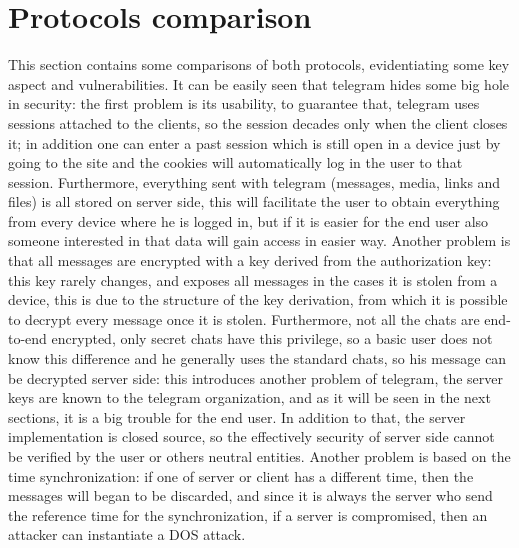 \documentclass{article}
\begin{document}

\section{Protocols comparison}

This section contains some comparisons of both protocols, evidentiating some key aspect and vulnerabilities. \newline
It can be easily seen that telegram hides some big hole in security: the first problem is its usability, to guarantee that, telegram uses sessions attached to the clients, so the session decades only when the client closes it; in addition one can enter a past session which is still open in a device just by going to the site and the cookies will automatically log in the user to that session. Furthermore, everything sent with telegram (messages, media, links and files) is all stored on server side, this will facilitate the user to obtain everything from every device where he is logged in, but if it is easier for the end user also someone interested in that data will gain access in easier way. Another problem is that all messages are encrypted with a key derived from the authorization key: this key rarely changes, and exposes all messages in the cases it is stolen from a device, this is due to the structure of the key derivation, from which it is possible to decrypt every message once it is stolen.\newline
Furthermore, not all the chats are end-to-end encrypted, only secret chats have this privilege, so a basic user does not know this difference and he generally uses the standard chats, so his message can be decrypted server side: this introduces another problem of telegram, the server keys are known to the telegram organization, and as it will be seen in the next sections, it is a big trouble for the end user. In addition to that, the server implementation is closed source, so the effectively security of server side cannot be verified by the user or others neutral entities.\newline
Another problem is based on the time synchronization: if one of server or client has a different time, then the messages will began to be discarded, and since it is always the server who send the reference time for the synchronization, if a server is compromised, then an attacker can instantiate a DOS attack.\newline
\end{document}
